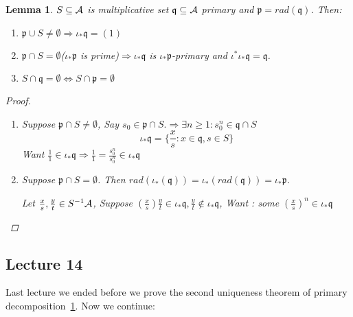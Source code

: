 \documentclass[11pt]{article}
\newtheorem{lemma}[thm]{Lemma}
\newcommand{\scp}{{\mathfrak p}}
\newcommand{\scq}{\mathfrak q}
\newcommand{\cala}{{\cal A}}
\newcommand{\Lrta}{\Longrightarrow}
\newcommand{\Llrta}{\Longleftrightarrow}
\begin{document}
\begin{lemma}\label{lem:second_uniqueness_decomposition}
$S\subseteq \cala$ is multiplicative set $\scq\subseteq \cala$ primary and $\scp=rad(\scq)$. Then:
\begin{enumerate}[label=(\alph*)]
\item $\scp\cup S\neq \emptyset \Lrta \iota_*\scq=(1)$
\item $\scp\cap S=\emptyset$($\iota_*\scp$ is prime)$\Lrta \iota_*\scq$ is $\iota_* \scp$-primary and $\iota^*\iota_* \scq=\scq$.
\item $S\cap \scq =\emptyset \Llrta S\cap \scp=\emptyset$ 
\end{enumerate}
\begin{proof}
\begin{enumerate}[label=(\alph*)]
\item 
Suppose $\scp\cap S\neq \emptyset$, Say $s_0\in \scp\cap S.\Lrta \exists n\geq 1: s_0^n\in \scq\cap S$
$$
\iota_*\scq=\{\frac{x}{s}:x\in \scq, s\in S\}
$$
Want $\frac{1}{1}\in \iota_* \scq\Lrta \frac{1}{1}=\frac{s_0^n}{s_0^n}\in \iota_*\scq$
\item Suppose $\scp \cap S=\emptyset$. Then $rad(\iota_*(\scq))=\iota_*(rad(\scq))=\iota_*\scp$.

Let $\frac{x}{s},\frac{y}{t}\in S^{-1}\cala$, Suppose $(\frac{x}{s})\frac{y}{t}\in \iota_* \scq ,\frac{y}{t}\notin \iota_*\scq$, Want : some $(\frac{x}{s})^n\in \iota_*\scq$
\end{enumerate}
\end{proof}
\end{lemma}

\subsection{Lecture 14}
Last lecture we ended before we prove the second uniqueness theorem of primary decomposition~\ref{lem:second_uniqueness_decomposition}. Now we continue:
\end{document}
